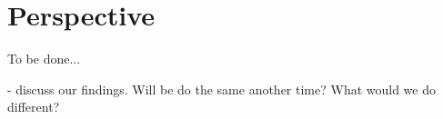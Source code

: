 \section{Perspective}
To be done...

- discuss our findings. Will be do the same another time? What would we do different?

\newpage